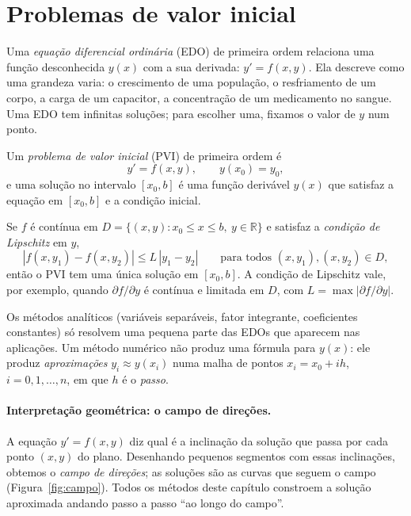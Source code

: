 \section{Problemas de valor inicial}

Uma \emph{equação diferencial ordinária} (EDO) de primeira ordem relaciona uma função
desconhecida $y(x)$ com a sua derivada: $y'=f(x,y)$. Ela descreve como uma grandeza
varia: o crescimento de uma população, o resfriamento de um corpo, a carga de um capacitor, a
concentração de um medicamento no sangue. Uma EDO tem infinitas soluções; para escolher uma,
fixamos o valor de $y$ num ponto.

\begin{definicao}
Um \emph{problema de valor inicial} (PVI) de primeira ordem é
\[
y'=f(x,y),\qquad y(x_0)=y_0,
\]
e uma solução no intervalo $[x_0,b]$ é uma função derivável $y(x)$ que satisfaz a equação em
$[x_0,b]$ e a condição inicial.
\end{definicao}

\begin{teorema}\label{teo:picard}
Se $f$ é contínua em $D=\{(x,y):x_0\le x\le b,\ y\in\mathbb R\}$ e satisfaz a
\emph{condição de Lipschitz} em $y$,
\[
|f(x,y_1)-f(x,y_2)|\le L\,|y_1-y_2|\qquad\text{para todos }(x,y_1),(x,y_2)\in D,
\]
então o PVI tem uma única solução em $[x_0,b]$. A condição de Lipschitz vale, por exemplo,
quando $\partial f/\partial y$ é contínua e limitada em $D$, com
$L=\max|\partial f/\partial y|$.
\end{teorema}

Os métodos analíticos (variáveis separáveis, fator integrante, coeficientes constantes) só
resolvem uma pequena parte das EDOs que aparecem nas aplicações. Um método numérico não
produz uma fórmula para $y(x)$: ele produz \emph{aproximações} $y_i\approx y(x_i)$ numa malha
de pontos $x_i=x_0+ih$, $i=0,1,\dots,n$, em que $h$ é o \emph{passo}.

\paragraph{Interpretação geométrica: o campo de direções.} A equação $y'=f(x,y)$ diz qual é a
inclinação da solução que passa por cada ponto $(x,y)$ do plano. Desenhando pequenos segmentos
com essas inclinações, obtemos o \emph{campo de direções}; as soluções são as curvas que
seguem o campo (Figura~\ref{fig:campo}). Todos os métodos deste capítulo constroem a solução
aproximada andando passo a passo ``ao longo do campo''.

